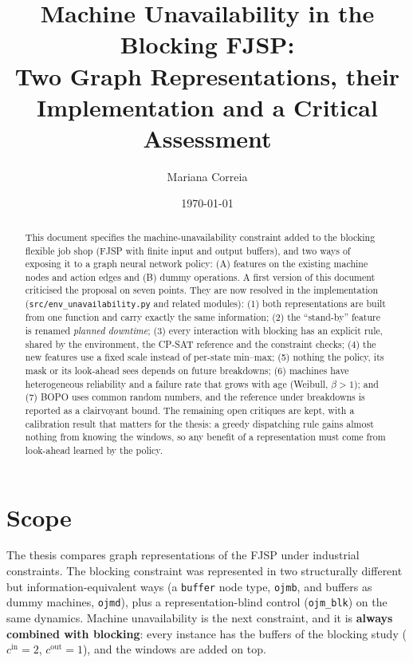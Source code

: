 \documentclass[11pt,a4paper]{article}
\title{Machine Unavailability in the Blocking FJSP:\\
Two Graph Representations, their Implementation and a Critical Assessment}
\author{Mariana Correia}
\date{\today}
\newcommand{\cin}{c^{\mathrm{in}}}
\newcommand{\cout}{c^{\mathrm{out}}}
\newcommand{\code}[1]{\texttt{#1}}
\begin{document}
\maketitle

\begin{abstract}
This document specifies the machine-unavailability constraint added to the blocking
flexible job shop (FJSP with finite input and output buffers), and two ways of exposing it to a
graph neural network policy: (A) features on the existing machine nodes and action edges and
(B) dummy operations. A first version of this document criticised the proposal on seven
points. They are now resolved in the implementation
(\code{src/env\_unavailability.py} and related modules):
(1) both representations are built from one function and carry exactly the same information;
(2) the ``stand-by'' feature is renamed \emph{planned downtime};
(3) every interaction with blocking has an explicit rule, shared by the environment, the
CP-SAT reference and the constraint checks;
(4) the new features use a fixed scale instead of per-state min--max;
(5) nothing the policy, its mask or its look-ahead sees depends on future breakdowns;
(6) machines have heterogeneous reliability and a failure rate that grows with age (Weibull,
$\beta>1$); and
(7) BOPO uses common random numbers, and the reference under breakdowns is reported as a
clairvoyant bound.
The remaining open critiques are kept, with a calibration result that matters for the thesis: a
greedy dispatching rule gains almost nothing from knowing the windows, so any benefit of a
representation must come from look-ahead learned by the policy.
\end{abstract}

\tableofcontents

\section{Scope}

The thesis compares graph representations of the FJSP under industrial constraints. The
blocking constraint was represented in two structurally different but information-equivalent
ways (a \code{buffer} node type, \code{ojmb}, and buffers as dummy machines, \code{ojmd}),
plus a representation-blind control (\code{ojm\_blk}) on the same dynamics.
Machine unavailability is the next constraint, and it is \textbf{always combined with blocking}:
every instance has the buffers of the blocking study ($\cin=2$, $\cout=1$), and the windows are
added on top.
\end{document}
